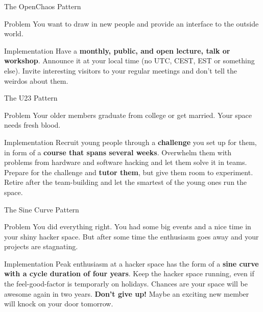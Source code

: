 \documentclass[mathserif]{beamer}
\begin{document}
\begin{frame}{The OpenChaos Pattern}
	\begin{alertblock}{Problem}
		You want to draw in new people and provide an interface to the outside
		world.
	\end{alertblock}
	\pause
	\begin{exampleblock}{Implementation}
		Have a \textbf{monthly, public, and open lecture, talk or workshop}.
		Announce it at your local time (no UTC, CEST, EST or something else).
		Invite interesting visitors to your regular meetings and don't tell the
		weirdos about them.	\end{exampleblock}
\end{frame}

\begin{frame}{The U23 Pattern}
	\begin{alertblock}{Problem}
		Your older members graduate from college or get married.  Your space needs
		fresh blood.
	\end{alertblock}
	\pause
	\begin{exampleblock}{Implementation}
		Recruit young people through a \textbf{challenge} you set up for them, in
		form of a \textbf{course that spans several weeks}.  Overwhelm them with
		problems from hardware and software hacking and let them solve it in teams.
		Prepare for the challenge and \textbf{tutor them}, but give them room to
		experiment.  Retire after the team-building and let the smartest of the
		young ones run the space.
	\end{exampleblock}
\end{frame}

\begin{frame}{The Sine Curve Pattern}
	\begin{alertblock}{Problem}
		You did everything right.  You had some big events and a nice time in your
		shiny hacker space.  But after some time the enthusiasm goes away and your
		projects are stagnating.
	\end{alertblock}
	\pause
	\begin{exampleblock}{Implementation}
		Peak enthusiasm at a hacker space has the form of a \textbf{sine curve with
		a cycle duration of four years}.  Keep the hacker space running, even if the
		feel-good-factor is temporarly on holidays.  Chances are your space will be
		awesome again in two years.  \textbf{Don't give up!}  Maybe an exciting new
		member will knock on your door tomorrow.
	\end{exampleblock}
\end{frame}
\end{document}

